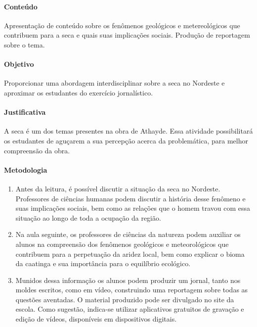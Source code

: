 \documentclass[12pt]{extarticle}
\begin{document}
\paragraph{Conteúdo} Apresentação de conteúdo sobre os fenômenos geológicos e metereológicos que contribuem para a seca e quais suas implicações sociais. Produção de reportagem sobre o tema.

\paragraph{Objetivo} Proporcionar uma abordagem interdisciplinar sobre a seca no Nordeste e aproximar os estudantes do exercício jornalístico.

\paragraph{Justificativa} A seca é um dos temas presentes na obra de Athayde. Essa atividade possibilitará os estudantes de aguçarem a sua percepção acerca da problemática, para melhor compreensão da obra.

\paragraph{Metodologia}

\begin{enumerate}

\item Antes da leitura, é possível discutir a situação da seca no
Nordeste. Professores de ciências humanas podem discutir a história
desse fenômeno e suas implicações sociais, bem como as relações que o
homem travou com essa situação ao longo de toda a ocupação da região.

\item Na aula seguinte, os professores de ciências da natureza podem auxiliar os
alunos na compreensão dos fenômenos geológicos e meteorológicos que
contribuem para a perpetuação da aridez local, bem como explicar o bioma
da caatinga e sua importância para o equilíbrio ecológico. 

\item Munidos dessa
informação os alunos podem produzir um jornal, tanto nos moldes
escritos, como em vídeo, construindo uma reportagem sobre todas as
questões aventadas. O material produzido pode ser divulgado no site da
escola. Como sugestão, indica-se utilizar aplicativos gratuitos de
gravação e edição de vídeos, disponíveis em dispositivos digitais.

\end{enumerate}
\end{document}
